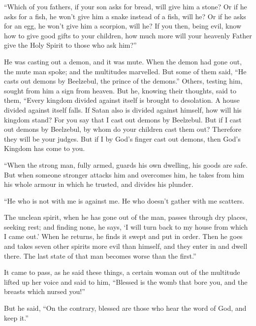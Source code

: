  ``Which of you fathers, if your son asks for bread, will
give him a stone? Or if he asks for a fish, he won't give him a snake
instead of a fish, will he?  Or if he asks for an egg, he
won't give him a scorpion, will he?  If you then, being
evil, know how to give good gifts to your children, how much more will
your heavenly Father give the Holy Spirit to those who ask him?''

 He was casting out a demon, and it was mute. When the
demon had gone out, the mute man spoke; and the multitudes marvelled.
 But some of them said, ``He casts out demons by
Beelzebul, the prince of the demons.''  Others, testing
him, sought from him a sign from heaven.  But he, knowing
their thoughts, said to them, ``Every kingdom divided against itself is
brought to desolation. A house divided against itself falls.
 If Satan also is divided against himself, how will his
kingdom stand? For you say that I cast out demons by Beelzebul.
 But if I cast out demons by Beelzebul, by whom do your
children cast them out? Therefore they will be your judges.
 But if I by God's finger cast out demons, then God's
Kingdom has come to you.

 ``When the strong man, fully armed, guards his own
dwelling, his goods are safe.  But when someone stronger
attacks him and overcomes him, he takes from him his whole armour in
which he trusted, and divides his plunder.

 ``He who is not with me is against me. He who doesn't
gather with me scatters.

 The unclean spirit, when he has gone out of the man,
passes through dry places, seeking rest; and finding none, he says, `I
will turn back to my house from which I came out.'  When
he returns, he finds it swept and put in order.  Then he
goes and takes seven other spirits more evil than himself, and they
enter in and dwell there. The last state of that man becomes worse than
the first.''

 It came to pass, as he said these things, a certain
woman out of the multitude lifted up her voice and said to him,
``Blessed is the womb that bore you, and the breasts which nursed you!''

 But he said, ``On the contrary, blessed are those who
hear the word of God, and keep it.''

